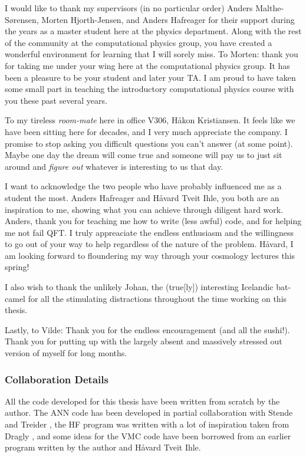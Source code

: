 \documentclass[twoside,english]{uiofysmaster}
\begin{document}

\begin{acknowledgements}
  I would like to thank my supervisors (in no particular order) Anders Malthe-Sørensen, Morten Hjorth-Jensen, and Anders Hafreager for their support during the years as a master student here at the physics department. Along with the rest of the community at the computational physics group, you have created a wonderful environment for learning that I will sorely miss. To Morten: thank you for taking me under your wing here at the computational physics group. It has been a pleasure to be your student and later your TA. I am proud to have taken some small part in teaching the introductory computational physics course with you these past several years. 

  To my tireless \emph{room-mate} here in office V306, Håkon Kristiansen. It feels like we have been sitting here for decades, and I very much appreciate the company. I promise to stop asking you difficult questions you can't answer (at some point). Maybe one day the dream will come true and someone will pay us to just sit around and \emph{figure out} whatever is interesting to us that day.

  I want to acknowledge the two people who have probably influenced me as a student the most. Anders Hafreager and Håvard Tveit Ihle, you both are an inspiration to me, showing what you can achieve through diligent hard work. Anders, thank you for teaching me how to write (less awful) code, and for helping me not fail QFT. I truly appreaciate the endless enthusiasm and the willingness to go out of your way to help regardless of the nature of the problem. Håvard, I am looking forward to floundering my way through your cosmology lectures this spring!

  I also wish to thank the unlikely Johan, the (true[ly]) interesting Icelandic bat-camel for all the stimulating distractions throughout the time working on this thesis.

  Lastly, to Vilde: Thank you for the endless encouragement (and all the sushi!). Thank you for putting up with the largely absent and massively stressed out version of myself for long months.

  \subsubsection*{Collaboration Details}
  All the code developed for this thesis have been written from scratch by the author. The ANN code has been developed in partial collaboration with Stende \cite{stende} and Treider \cite{treider}, the HF program was written with a lot of inspiration taken from Dragly \cite{dragly}, and some ideas for the VMC code have been borrowed from an earlier program written by the author and Håvard Tveit Ihle.


\end{acknowledgements}
\end{document}
